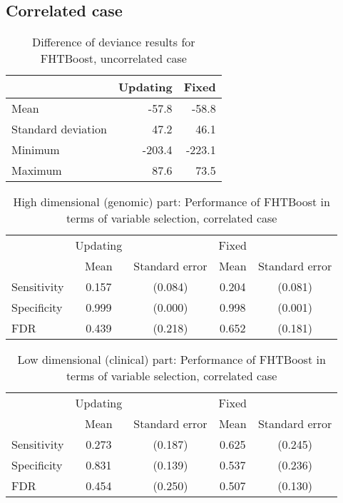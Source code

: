 \subsection{Correlated case}

\begin{table}
\caption{Difference of deviance results for FHTBoost, uncorrelated case}
\label{table:uncorrelated-deviance}
\centering
\begin{tabular}{l|rr}
\toprule
& Updating & Fixed \\
\hline
Mean               &  -57.8  &  -58.8  \\
Standard deviation &   47.2  &   46.1  \\
Minimum            & -203.4  & -223.1  \\
Maximum            &   87.6  &   73.5  \\
\bottomrule
\end{tabular}
\end{table}

\begin{table}
\caption{High dimensional (genomic) part: Performance of FHTBoost in terms of variable selection, correlated case}
\label{table:correlated-y0}
\centering
\begin{tabular}{l|cc|cc}
\toprule
& Updating & & Fixed & \\
& Mean & Standard error & Mean & Standard error \\
\hline
Sensitivity & 0.157 & (0.084) & 0.204 & (0.081) \\
Specificity & 0.999 & (0.000) & 0.998 & (0.001) \\
FDR         & 0.439 & (0.218) & 0.652 & (0.181) \\
\bottomrule
\end{tabular}
\end{table}

\begin{table}
\caption{Low dimensional (clinical) part: Performance of FHTBoost in terms of variable selection, correlated case}
\label{table:correlated-mu}
\centering
\begin{tabular}{l|cc|cc}
\toprule
& Updating & & Fixed & \\
& Mean & Standard error & Mean & Standard error \\
\hline
Sensitivity & 0.273 & (0.187) & 0.625 & (0.245) \\
Specificity & 0.831 & (0.139) & 0.537 & (0.236) \\
FDR         & 0.454 & (0.250) & 0.507 & (0.130) \\
\bottomrule
\end{tabular}
\end{table}

